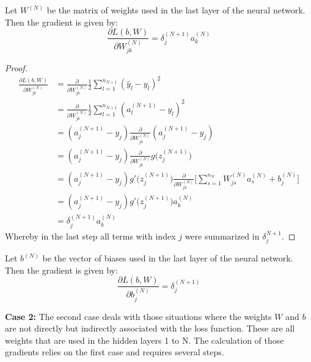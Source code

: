 \begin{remark}
	Let $W^{(N)}$ be the matrix of weights used in the last layer of the neural network. Then the gradient is given by: 
	\begin{equation*}
		\frac{\partial L(b,W)}{\partial W_{jk}^{(N)}} = \delta_j^{(N+1)} a_k^{(N)} 
	\end{equation*}
	
	\begin{proof}
	\begin{align*} %
		\frac{\partial L(b,W)}{\partial W_{jk}^{(N)}} 
		&= \frac{\partial}{\partial W_{jk}^{(N)}} \frac{1}{2} \sum_{l = 1}^{n_{N+1}} (\hat{y}_l - y_l)^2 \\
		&= \frac{\partial}{\partial W_{jk}^{(N)}} \frac{1}{2} \sum_{l = 1}^{n_{N+1}} (a_l^{(N+1)} - y_l)^2  \\
		&= (a_j^{(N+1)} - y_j)  \frac{\partial}{\partial W_{jk}^{(N)}} (a_j^{(N+1)} - y_j) \\
		&= (a_j^{(N+1)} - y_j)  \frac{\partial}{\partial W_{jk}^{(N)}} g\big(z_j^{(N+1)} \big)  \\
		&= (a_j^{(N+1)} - y_j)  g'\big(z_j^{(N+1)} \big) \frac{\partial}{\partial W_{jk}^{(N)}} \bigg[ \sum_{s=1}^{n_N} W_{js}^{(N)} a_s^{(N)} + b_j^{(N)} \bigg] \\
		&= (a_j^{(N+1)} - y_j)  g'\big(z_j^{(N+1)} \big) a_k^{(N)} \\
		&=	\delta_j^{(N+1)} a_k^{(N)} 
	\end{align*}
	Whereby in the last step all terms with index $j$ were summarized in $\delta_j^{N+1}$.
	\end{proof}
\end{remark}

\begin{remark}
	Let $b^{(N)}$ be the vector of biases used in the last layer of the neural network. Then the gradient is given by: 
	\begin{equation*}
		\frac{\partial L(b,W)}{\partial b_{j}^{(N)}} = \delta_j^{(N+1)}
	\end{equation*}
\end{remark}

\textbf{Case 2:} The second case deals with those situations where the weights $W$ and $b$ are not directly but indirectly associated with the loss function. These are all weights that are used in the hidden layers 1 to N. The calculation of those gradients relies on the first case and requires several steps.

